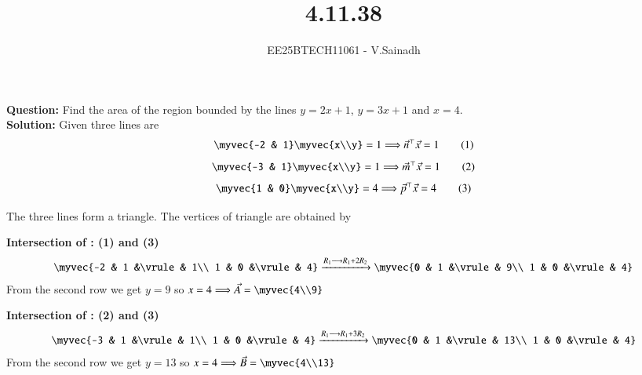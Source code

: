 \documentclass[journal]{IEEEtran}
\begin{document}

\vspace{3cm}

\title{4.11.38}
\author{EE25BTECH11061 - V.Sainadh}

\maketitle
{\let\newpage\relax\maketitle}
\renewcommand{\thefigure}{\theenumi}
\renewcommand{\thetable}{\theenumi}
\setlength{\intextsep}{10pt}


{\Large

\textbf{Question:} Find the area of the region bounded by the lines $y=2x+1$, $y=3x+1$ and $x=4$. \\

\textbf{Solution:}  
Given three lines are
\begin{align}
\myvec{-2 & 1}\myvec{x\\y} = 1 \Longrightarrow \vec{n}^\top\vec{x} = 1 \tag{1}
\end{align}
\begin{align}
\myvec{-3 & 1}\myvec{x\\y} = 1 \Longrightarrow \vec{m}^\top\vec{x} = 1 \tag{2}
\end{align}
\begin{align}
\myvec{1 & 0}\myvec{x\\y} = 4 \Longrightarrow \vec{p}^\top\vec{x} = 4 \tag{3}
\end{align}

The three lines form a triangle.  
The vertices of triangle are obtained by 

\textbf{Intersection of : (1) and (3)}
\begin{align}
\myvec{-2 & 1 &\vrule& 1\\
1 & 0 &\vrule& 4} \xrightarrow{R_1 \longrightarrow R_1+2R_2}
\myvec{0 & 1 &\vrule& 9\\
1 & 0 &\vrule& 4}
\end{align}
From the second row we get $y=9$ so $x=4 \Longrightarrow
\vec{A} = \myvec{4\\9}$

\textbf{Intersection of : (2) and (3)}
\begin{align}
\myvec{-3 & 1 &\vrule& 1\\
1 & 0 &\vrule& 4} \xrightarrow{R_1 \longrightarrow R_1+3R_2}
\myvec{0 & 1 &\vrule& 13\\
1 & 0 &\vrule& 4}
\end{align}
From the second row we get $y=13$ so $x=4 \Longrightarrow
\vec{B} = \myvec{4\\13}$

}
\end{document}
